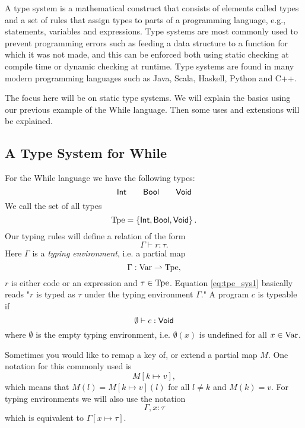 A type system is a mathematical construct that consists of elements called types
and a set of rules that assign types to parts of a programming language, e.g.,
statements, variables and expressions. Type systems are most commonly used to
prevent programming errors such as feeding a data structure to a function for
which it was not made, and this can be enforced both using static checking at
compile time or dynamic checking at runtime. Type systems are found in many
modern programming languages such as Java, Scala, Haskell, Python and C++.

The focus here will be on static type systems. We will explain the basics using
our previous example of the While language. Then some uses and extensions will be
explained.

\subsection{A Type System for While}
\label{sub:a_type_system_for_while}

For the While language we have the following types:
\begin{equation*}
  \mbox{$\mathsf{Int}$} \quad\quad \mbox{$\mathsf{Bool}$} \quad\quad \mbox{$\mathsf{Void}$}
\end{equation*}
We call the set of all types 
\begin{equation*}
  \mbox{$\mathrm{Tpe}$} = \left\{ \mbox{$\mathsf{Int}$}, \mbox{$\mathsf{Bool}$}, \mbox{$\mathsf{Void}$} \right\}.
\end{equation*}
Our typing rules will define a relation of the form
\begin{equation} \label{eq:tpe_sys1}
  \Gamma \vdash r : \tau.
\end{equation}
Here $\Gamma$ is a \emph{typing environment}, i.e. a partial map
\begin{equation*}
  \Gamma: \mbox{$\mathrm{Var}$} \rightharpoonup \mbox{$\mathrm{Tpe}$},
\end{equation*}
$r$ is either code or an expression and $\tau \in \mbox{$\mathrm{Tpe}$}$.
Equation \eqref{eq:tpe_sys1} basically reads "$r$ is typed as $\tau$ under the
typing environment $\Gamma$." A program $c$ is typeable if
\begin{equation*}
  \emptyset \vdash c : \mbox{$\mathsf{Void}$}
\end{equation*}
where $\emptyset$ is the empty typing environment, i.e. $\emptyset(x)$ is
undefined for all $x \in \mbox{$\mathrm{Var}$}$.

\begin{notation}
  Sometimes you would like to remap a key of, or extend a partial map $M$. One notation
  for this commonly used is 
  \begin{equation*}
    M[k \mapsto v],
  \end{equation*}
  which means that $M(l) = M[k \mapsto v](l)$ for all $l \neq k$ and
  $M(k) = v$.
  For typing environments we will also use the notation
  \begin{equation*}
    \Gamma, x: \tau
  \end{equation*}
  which is equivalent to $\Gamma[x \mapsto \tau]$.
\end{notation}

